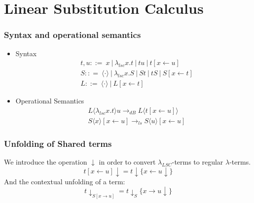 \documentclass{beamer}
\begin{document}
\section{Linear Substitution Calculus}
\begin{frame}
  \frametitle{Syntax and operational semantics}
\begin{itemize}
  \item Syntax
    \begin{equation}
    \begin{split}
      & t, u ::= \ x \ | \ \lambda_{lsc}x.t \ | \ tu \ | \ t[x \leftarrow u ] \\
      & S :: = \ \langle \cdot \rangle \ | \ \lambda_{lsc}x.S \ | \ St \ | \ tS \ | \ S[x \leftarrow t] \\
      & L ::= \ \langle \cdot \rangle \ | \ L[x \leftarrow t]
    \end{split}
  \end{equation}

  \item Operational Semantics
        \begin{equation}
          \begin{split}
            & L \langle \lambda_{lsc} x.t \rangle u \rightarrow_{dB} L \langle t [x \leftarrow u] \rangle \\
            & S \langle x \rangle [x \leftarrow u] \rightarrow_{ls} S \langle u \rangle [x \leftarrow u]
          \end{split}
        \end{equation}
\end{itemize}
\end{frame}
\begin{frame}
  \frametitle{Unfolding of Shared terms}
  We introduce the operation $\downarrow$ in order to convert $\lambda_{LSC}$-terms to regular $\lambda$-terms.
  \begin{equation}
  t[x \leftarrow u]\downarrow = t\downarrow \{ x \leftarrow u \downarrow \}
\end{equation}
And the contextual unfolding of a term:
\begin{equation}
  t \downarrow_{S[x \rightarrow u]} = t \downarrow_{S} \{ x \rightarrow u \downarrow \}
\end{equation}
\end{frame}
\end{document}
